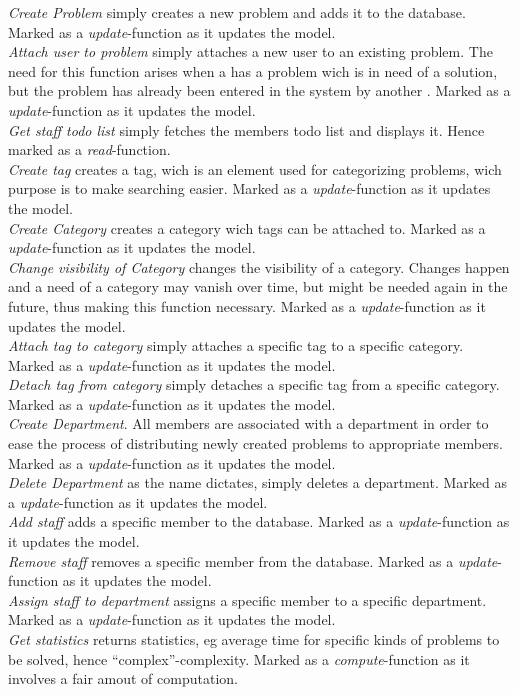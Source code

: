 \emph{Create Problem} simply creates a new problem and adds it to the database. Marked as a \textit{update}-function as it updates the model.  \\
\emph{Attach user to problem} simply attaches a new user to an existing problem. The need for this function arises when a \client has a problem wich is in need of a solution, but the problem has already been entered in the system by another \client. Marked as a \textit{update}-function as it updates the model. \\
\emph{Get staff todo list} simply fetches the \staff members todo list and displays it. Hence marked as a \textit{read}-function. \\
\emph{Create tag} creates a tag, wich is an element used for categorizing problems, wich purpose is to make searching easier. Marked as a \textit{update}-function as it updates the model. \\
\emph{Create Category} creates a category wich tags can be attached to. Marked as a \textit{update}-function as it updates the model. \\
\emph{Change visibility of Category} changes the visibility of a category. Changes happen and a need of a category may vanish over time, but might be needed again in the future, thus making this function necessary. Marked as a \textit{update}-function as it updates the model. \\
\emph{Attach tag to category} simply attaches a specific tag to a specific category. Marked as a \textit{update}-function as it updates the model. \\
\emph{Detach tag from category} simply detaches a specific tag from a specific category. Marked as a \textit{update}-function as it updates the model. \\
\emph{Create Department}. All \staff members are associated with a department in order to ease the process of distributing newly created problems to appropriate \staff members. Marked as a \textit{update}-function as it updates the model. \\
\emph{Delete Department} as the name dictates, simply deletes a department. Marked as a \textit{update}-function as it updates the model. \\
\emph{Add staff} adds a specific \staff member to the database. Marked as a \textit{update}-function as it updates the model. \\
\emph{Remove staff} removes a specific \staff member from the database. Marked as a \textit{update}-function as it updates the model. \\
\emph{Assign staff to department} assigns a specific \staff member to a specific department. Marked as a \textit{update}-function as it updates the model. \\
\emph{Get statistics} returns statistics, eg average time for specific kinds of problems to be solved, hence ``complex''-complexity. Marked as a \textit{compute}-function as it involves a fair amout of computation.